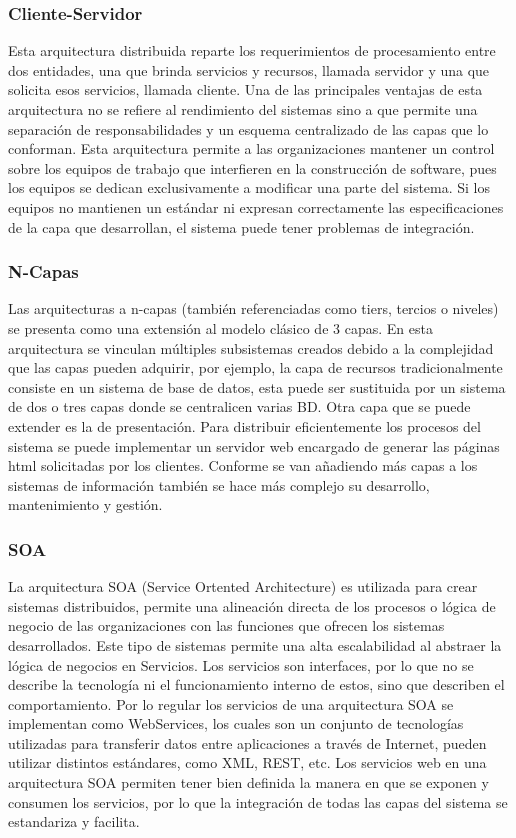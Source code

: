 \subsubsection{ Cliente-Servidor }
Esta arquitectura distribuida reparte los requerimientos de procesamiento entre dos entidades, una que brinda servicios y recursos, llamada servidor y una que solicita esos servicios, llamada cliente.
Una de las principales ventajas de esta arquitectura no se refiere al rendimiento del sistemas sino a que permite una separación de responsabilidades y un esquema centralizado de las capas que lo conforman. Esta arquitectura permite a las organizaciones mantener un control sobre los equipos de trabajo que interfieren en la construcción de software, pues los equipos se dedican exclusivamente a modificar una parte del sistema. Si los equipos no mantienen un estándar ni expresan correctamente las especificaciones de la capa que desarrollan, el sistema puede tener problemas de integración.

\subsubsection{ N-Capas }
 Las arquitecturas a n-capas (también referenciadas como tiers, tercios o niveles) se presenta como una extensión al modelo clásico de 3 capas. En esta arquitectura se vinculan múltiples subsistemas creados debido a la complejidad que las capas pueden adquirir, por ejemplo, la capa de recursos tradicionalmente consiste en un sistema de base de datos, esta puede ser sustituida por un sistema de dos o tres capas donde se centralicen varias BD. Otra capa que se puede extender es la de presentación. Para distribuir eficientemente los procesos del sistema se puede implementar un servidor web encargado de generar las páginas html solicitadas por los clientes.
Conforme se van añadiendo más capas a los sistemas de información también se hace más complejo su desarrollo, mantenimiento y gestión.

\subsubsection{ SOA }
La arquitectura SOA (Service Ortented Architecture) es utilizada para crear sistemas distribuidos, permite una alineación directa de los procesos o lógica de negocio de las organizaciones con las funciones que ofrecen los sistemas desarrollados. Este tipo de sistemas permite una alta escalabilidad al  abstraer la lógica de negocios en Servicios. Los servicios son interfaces, por lo que no se describe la tecnología ni el funcionamiento interno de estos, sino que describen el comportamiento. Por lo regular  los servicios de una arquitectura SOA se implementan como WebServices, los cuales son un conjunto de tecnologías utilizadas para transferir datos entre aplicaciones a través de Internet, pueden utilizar distintos estándares, como XML, REST, etc.
Los servicios web en una arquitectura SOA permiten tener bien definida la manera en que se exponen y consumen los servicios, por lo que la integración de todas las capas del sistema se estandariza y facilita.

